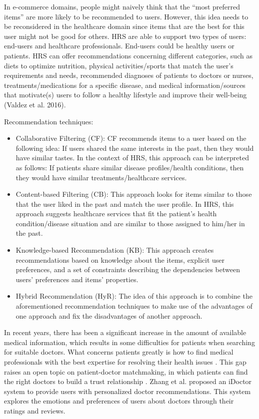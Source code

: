 In e-commerce domains, people might naively think that the ``most preferred items'' are more likely to be recommended to users. However, this idea needs to be reconsidered in the healthcare domain since items that are the best for this user might not be good for others. HRS are able to support two types of users: end-users and healthcare professionals. End-users could be healthy users or patients. HRS can offer recommendations concerning different categories, such as diets to optimize nutrition, physical activities/sports that match the user's requirements and needs, recommended diagnoses of patients to doctors or nurses, treatments/medications for a specific disease, and medical information/sources that motivate(s) users to follow a healthy lifestyle and improve their well-being (Valdez et al. 2016).

Recommendation techniques:

\begin{itemize}
    \item Collaborative Filtering (CF): CF recommends items to a user based on the following idea: If users shared the same interests in the past, then they would have similar tastes. In the context of HRS, this approach can be interpreted as follows: If patients share similar disease profiles/health conditions, then they would have similar treatments/healthcare services.
    \item Content-based Filtering (CB): This approach looks for items similar to those that the user liked in the past and match the user profile. In HRS, this approach suggests healthcare services that fit the patient's health condition/disease situation and are similar to those assigned to him/her in the past.
    \item Knowledge-based Recommendation (KB): This approach creates recommendations based on knowledge about the items, explicit user preferences, and a set of constraints describing the dependencies between users' preferences and items' properties.
    \item Hybrid Recommendation (HyR): The idea of this approach is to combine the aforementioned recommendation techniques to make use of the advantages of one approach and fix the disadvantages of another approach.
\end{itemize}

In recent years, there has been a significant increase in the amount of available medical information, which results in some difficulties for patients when searching for suitable doctors. What concerns patients greatly is how to find medical professionals with the best expertise for resolving their health issues \cite{narducci_recommender_2015, hoens_reliable_2010}. This gap raises an open topic on patient-doctor matchmaking, in which patients can find the right doctors to build a trust relationship \cite{han_hybrid_2018}.
Zhang et al. \cite{zhang_idoctor_2017} proposed an iDoctor system to provide users with personalized doctor recommendations. This system explores the emotions and preferences of users about doctors through their ratings and reviews.

